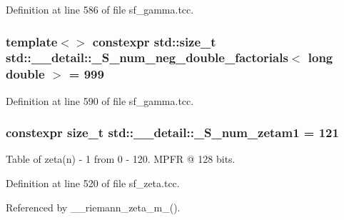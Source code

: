 Definition at line 586 of file sf\+\_\+gamma.\+tcc.

\subsubsection[{\texorpdfstring{\+\_\+\+S\+\_\+num\+\_\+neg\+\_\+double\+\_\+factorials$<$ long double $>$}{_S_num_neg_double_factorials< long double >}}]{\setlength{\rightskip}{0pt plus 5cm}template$<$$>$ constexpr std\+::size\+\_\+t {\bf std\+::\+\_\+\+\_\+detail\+::\+\_\+\+S\+\_\+num\+\_\+neg\+\_\+double\+\_\+factorials}$<$ long double $>$ = 999}\hypertarget{namespacestd_1_1____detail_a2ef051ec96e521e71489d2327d11c22a}{}\label{namespacestd_1_1____detail_a2ef051ec96e521e71489d2327d11c22a}


Definition at line 590 of file sf\+\_\+gamma.\+tcc.

\subsubsection[{\texorpdfstring{\+\_\+\+S\+\_\+num\+\_\+zetam1}{_S_num_zetam1}}]{\setlength{\rightskip}{0pt plus 5cm}constexpr size\+\_\+t std\+::\+\_\+\+\_\+detail\+::\+\_\+\+S\+\_\+num\+\_\+zetam1 = 121}\hypertarget{namespacestd_1_1____detail_a807e36c2aec3a9f27fdb21726cd464e2}{}\label{namespacestd_1_1____detail_a807e36c2aec3a9f27fdb21726cd464e2}
Table of zeta(n) -\/ 1 from 0 -\/ 120. M\+P\+FR @ 128 bits. 

Definition at line 520 of file sf\+\_\+zeta.\+tcc.



Referenced by \+\_\+\+\_\+riemann\+\_\+zeta\+\_\+m\+\_().

